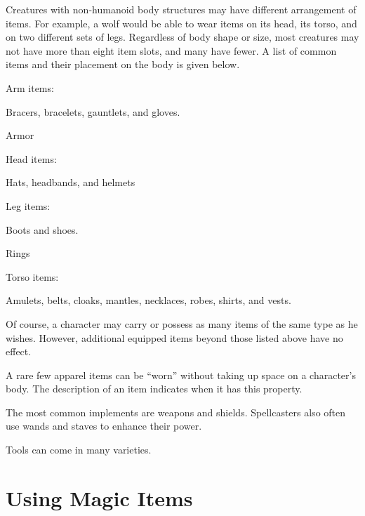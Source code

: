Creatures with non-humanoid body structures may have different arrangement of items. For example, a wolf would be able to wear items on its head, its torso, and on two different sets of legs. Regardless of body shape or size, most creatures may not have more than eight item slots, and many have fewer. A list of common items and their placement on the body is given below.

\begin{itemize*}
  \item Arm items:
    \begin{itemize*}
      \item Bracers, bracelets, gauntlets, and gloves.
    \end{itemize*}
  \item Armor
  \item Head items:
    \begin{itemize*}
      \item Hats, headbands, and helmets
    \end{itemize*}
  \item Leg items:
    \begin{itemize*}
      \item Boots and shoes.
    \end{itemize*}
  \item Rings
  \item Torso items:
    \begin{itemize*}
      \item Amulets, belts, cloaks, mantles, necklaces, robes, shirts, and vests.
    \end{itemize*}
\end{itemize*}

Of course, a character may carry or possess as many items of the same type as he wishes. However, additional equipped items beyond those listed above have no effect.

A rare few apparel items can be ``worn'' without taking up space on a character's body. The description of an item indicates when it has this property.

 The most common implements are weapons and shields. Spellcasters also often use wands and staves to enhance their power.

 Tools can come in many varieties.

\section{Using Magic Items}

